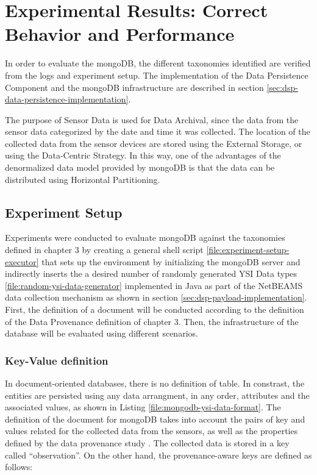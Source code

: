 

\chapter{Experimental Results: Correct Behavior and Performance}

In order to evaluate the mongoDB, the different taxonomies identified are
verified from the logs and experiment setup. The implementation of the Data
Persistence Component and the mongoDB infrastructure are described in section
\ref{sec:dsp-data-persistence-implementation}.

The purpose of Sensor Data is used for Data Archival, since the data from the
sensor data categorized by the date and time it was collected. The location
of the collected data from the sensor devices are stored using the External
Storage, or using the Data-Centric Strategy. In this way, one of the advantages
of the denormalized data model provided by mongoDB is that the data can be
distributed using Horizontal Partitioning.

\section{Experiment Setup}

Experiments were conducted to evaluate mongoDB against the taxonomies defined in
chapter 3 by creating a general shell script
\ref{file:experiment-setup-executor} that sets up the environment by
initializing the mongoDB server and indirectly inserts the a desired number of
randomly generated YSI Data types \ref{file:random-ysi-data-generator}
implemented in Java as part of the NetBEAMS data collection mechanism as shown
in section \ref{sec:dsp-payload-implementation}. First, the definition of a 
document will be conducted according to the definition of the Data Provenance
definition of chapter 3. Then, the infrastructure of the database will be
evaluated using different scenarios.

\subsection{Key-Value definition}
\label{sec:keys-definition}

In document-oriented databases, there is no definition of table. In constrast,
the entities are persisted using any data arrangment, in any order, attributes
and the associated values, as shown in Listing
\ref{file:mongodb-ysi-data-format}. The definition of the document for mongoDB
takes into account the pairs of key and values related for the collected data
from the sensors, as well as the properties defined by the data provenance
study \cite{sn-provenance}. The collected data is stored in a key called
``observation''. On the other hand, the provenance-aware keys are defined as
follows:

